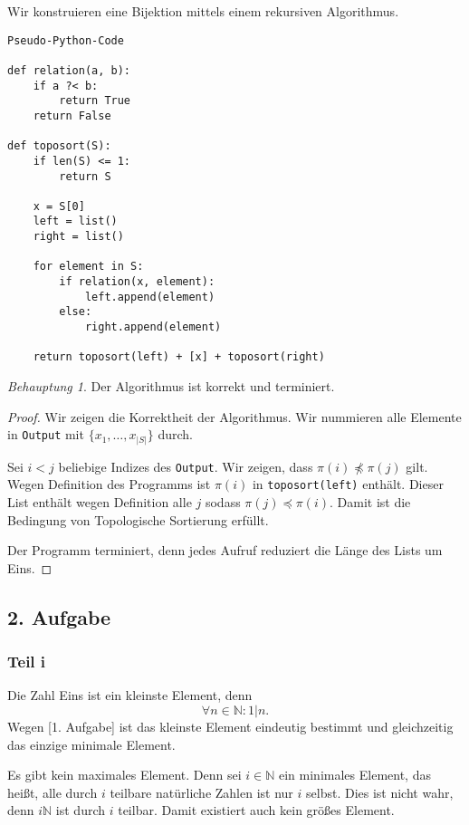 \documentclass[a5paper]{article}
\providecommand{\abs}[1]{\left\lvert#1\right\rvert}
\newcommand{\mt}{\texttt}
\newcommand{\npreceq}{\npreccurlyeq}
\theoremstyle{remark}
\newtheorem*{Behauptung}{Behauptung}
\begin{document}
  Wir konstruieren eine Bijektion mittels einem rekursiven
  Algorithmus.
\begin{verbatim}
Pseudo-Python-Code

def relation(a, b):
    if a ?< b:
        return True
    return False

def toposort(S):
    if len(S) <= 1:
        return S

    x = S[0]
    left = list()
    right = list()

    for element in S:
        if relation(x, element):
            left.append(element)
        else:
            right.append(element)

    return toposort(left) + [x] + toposort(right)
\end{verbatim}
  \begin{Behauptung}
    Der Algorithmus ist korrekt und terminiert.
  \end{Behauptung}
  \begin{proof}
    Wir zeigen die Korrektheit der Algorithmus.  Wir nummieren alle
    Elemente in \mt{Output}  mit \(\{x_{1}, \ldots, x_{\abs{S}}\}\) durch.

    Sei  \(i < j\) beliebige Indizes des \mt{Output}.  Wir
    zeigen, dass \(\pi(i) \npreceq \pi(j)\) gilt.  Wegen Definition des Programms
    ist \(\pi(i)\) in \mt{toposort(left)} enthält.  Dieser List enthält
    wegen Definition alle \(j\) sodass \(\pi(j) \preceq \pi(i)\).  Damit ist die
    Bedingung von Topologische Sortierung erfüllt.

    Der Programm terminiert, denn jedes Aufruf reduziert die Länge des
    Lists um Eins.
  \end{proof}

\subsection{2. Aufgabe}

\subsubsection{Teil i}
Die Zahl Eins ist ein kleinste Element, denn
\[\forall n \in \mathbb{N}\colon 1 \vert n.\]
Wegen [1. Aufgabe] ist das kleinste Element eindeutig bestimmt und
gleichzeitig das einzige minimale Element.

Es gibt kein maximales Element.  Denn sei \(i \in \mathbb{N}\) ein minimales
Element, das heißt, alle durch \(i\) teilbare natürliche Zahlen ist nur
\(i\) selbst.  Dies ist nicht wahr, denn \(i\mathbb{N}\) ist durch \(i\) teilbar.
Damit existiert auch kein größes Element.
\end{document}
